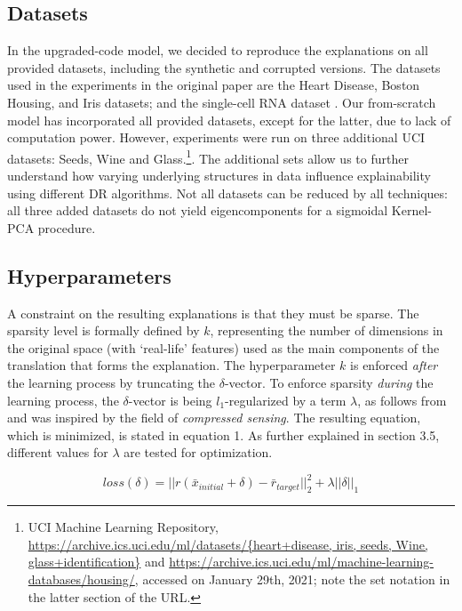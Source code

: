 \subsection{Datasets}
In the upgraded-code model, we decided to reproduce the explanations on all provided datasets, including the synthetic and corrupted versions. The datasets used in the experiments in the original paper are the Heart Disease, Boston Housing, and Iris datasets; and the single-cell RNA dataset \cite{shekhar2016comprehensive}. Our from-scratch model has incorporated all provided datasets, except for the latter, due to lack of computation power. However, experiments were run on three additional UCI datasets: Seeds, Wine and Glass.\footnote{UCI Machine Learning Repository, \url{https://archive.ics.uci.edu/ml/datasets/{heart+disease, iris, seeds, Wine, glass+identification}} and \url{https://archive.ics.uci.edu/ml/machine-learning-databases/housing/}, accessed on January 29th, 2021; note the set notation in the latter section of the URL.}. The additional sets allow us to further understand how varying underlying structures in data influence explainability using different DR algorithms. Not all datasets can be reduced by all techniques: all three added datasets do not yield eigencomponents for a sigmoidal Kernel-PCA procedure.

\subsection{Hyperparameters}
A constraint on the resulting explanations is that they must be sparse. The sparsity level is formally defined by $k$, representing the number of dimensions in the original space (with `real-life' features) used as the main components of the translation that forms the explanation. The hyperparameter $k$ is enforced \textit{after} the learning process by truncating the $\delta$-vector. To enforce sparsity \textit{during} the learning process, the $\delta$-vector is being $l_1$-regularized by a term $\lambda$, as follows from \cite[p.~5]{plumb2020explaining} and was inspired by the field of \textit{compressed sensing}. The resulting equation, which is minimized, is stated in equation 1. As further explained in section 3.5, different values for $\lambda$ are tested for optimization.

\begin{equation}
loss(\delta) = ||r(\bar{x}_{initial} + \delta) - \bar{r}_{target}||^2_2 + \lambda||\delta||_1
\end{equation}

